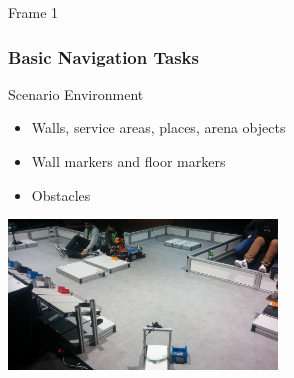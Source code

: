 
\begin{frame}{Frame 1}
\frametitle {Basic Navigation Tasks}
 
\begin{block}{Scenario Environment}
\begin{itemize}
\item Walls, service areas, places, arena objects
\item Wall markers and floor markers
\item Obstacles
\end{itemize}
\end{block}  
 
	\centering
    \includegraphics[height=40mm]{slides/gfx/arena.jpg}
 
\end{frame}
